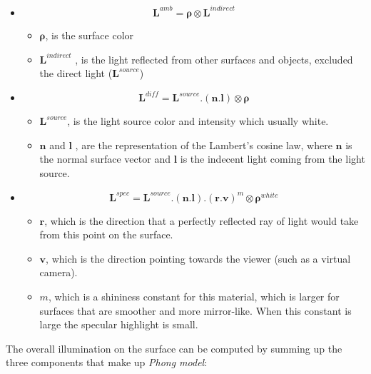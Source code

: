 \documentclass[11pt,a4paper]{article}
\begin{document}
	\begin{itemize}
		\item {}
		\begin{equation}
			\pmb{L}^{amb} = \pmb{\rho}\otimes \pmb{L}^{indirect}
		\end{equation}
		
		\begin{itemize}
			\item $\pmb{\rho}$, is the surface color
			\item $\pmb{L}^{indirect}$ , is the light reflected from other surfaces and objects, excluded the direct light ($\pmb{L}^{source}$)
		\end{itemize}
		\item {} 
		
		\begin{equation}
			\pmb{L}^{diff} =  \pmb{L}^{source}.(\pmb{n}.\pmb{l}) \otimes \pmb{\rho} 
		\end{equation}
		\begin{itemize}
			\item $\pmb{L}^{source}$, is the light source color and intensity which usually white. 
			\item $\pmb{n}$ and $\pmb{l}$ , are the representation of the Lambert's cosine law, where $\pmb{n}$ is the normal surface vector  and $\pmb{l}$ is the indecent light coming from the light source.
		\end{itemize}
		\item {} 
		
		\begin{equation}
			\pmb{L}^{spec} =  \pmb{L}^{source}.(\pmb{n}.\pmb{l}).(\pmb{r}.\pmb{v})^m \otimes \pmb{\rho}^{white} 
		\end{equation}
		\begin{itemize}
			\item $\pmb{r}$, which is the direction that a perfectly reflected ray of light would take from this point on the surface. 
			\item $\pmb{v}$, which is the direction pointing towards the viewer (such as a virtual camera).
			\item $m$, which is a shininess constant for this material, which is larger for surfaces that are smoother and more mirror-like. When this constant is large the specular highlight is small.
		\end{itemize}
	\end{itemize}
	
	The overall illumination on the surface can be computed by summing up the three components that make up \textit{Phong model}:
	
\end{document}
